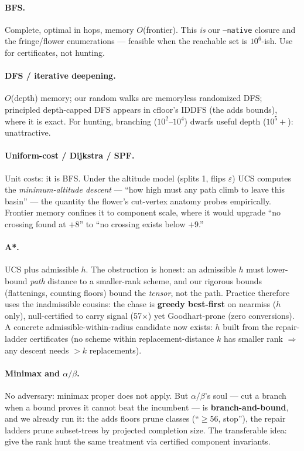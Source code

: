 \documentclass[10pt]{article}
\begin{document}
\paragraph{BFS.} Complete, optimal in hops, memory $O$(frontier).
This \emph{is} our \texttt{--native} closure and the fringe/flower
enumerations --- feasible when the reachable set is $10^6$-ish.
Use for certificates, not hunting.

\paragraph{DFS / iterative deepening.} $O$(depth) memory; our
random walks are memoryless randomized DFS; principled
depth-capped DFS appears in cfloor's IDDFS (the adds bounds),
where it is exact. For hunting, branching ($10^2$--$10^4$) dwarfs
useful depth ($10^5+$): unattractive.

\paragraph{Uniform-cost / Dijkstra / SPF.} Unit costs: it is BFS.
Under the altitude model (splits 1, flips $\varepsilon$) UCS
computes the \emph{minimum-altitude descent} --- ``how high must
any path climb to leave this basin'' --- the quantity the flower's
cut-vertex anatomy probes empirically. Frontier memory confines it
to component scale, where it would upgrade ``no crossing found at
$+8$'' to ``no crossing exists below $+9$.''

\paragraph{A*.} UCS plus admissible $h$. The obstruction is honest:
an admissible $h$ must lower-bound \emph{path} distance to a
smaller-rank scheme, and our rigorous bounds (flattenings,
counting floors) bound the \emph{tensor}, not the path. Practice
therefore uses the inadmissible cousins: the chase is
\textbf{greedy best-first} on nearmiss ($h$ only), null-certified
to carry signal (57$\times$) yet Goodhart-prone (zero conversions).
A concrete admissible-within-radius candidate now exists: $h$
built from the repair-ladder certificates (no scheme within
replacement-distance $k$ has smaller rank $\Rightarrow$ any descent
needs $> k$ replacements).

\paragraph{Minimax and $\alpha/\beta$.} No adversary: minimax
proper does not apply. But $\alpha/\beta$'s soul --- cut a branch
when a bound proves it cannot beat the incumbent --- is
\textbf{branch-and-bound}, and we already run it: the adds floors
prune classes (``$\ge 56$, stop''), the repair ladders prune
subset-trees by projected completion size. The transferable idea:
give the rank hunt the same treatment via certified component
invariants.
\end{document}

